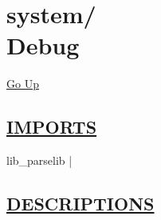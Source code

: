 \chapter*{\color{headfile}
{\large system\slash\hspace{0pt}}
 \\
Debug
}
\hypertarget{ecldoc:toc:system.Debug}{}
\hyperlink{ecldoc:toc:root/system}{Go Up}

\section*{\underline{\textsf{IMPORTS}}}
\begin{doublespace}
{\large
lib\_parselib |
}
\end{doublespace}

\section*{\underline{\textsf{DESCRIPTIONS}}}
